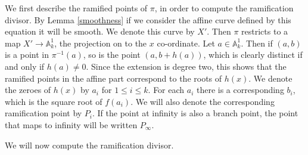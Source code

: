 We first describe the ramified points of $\pi$, in order to compute the ramification divisor.
By Lemma \ref{smoothness} if we consider the affine curve defined by this equation it will be smooth.
We denote this curve by $X'$.
Then $\pi$ restricts to a map $X'\rightarrow \mathbb A^1_k$, the projection on to the $x$ co-ordinate.
Let $a\in \mathbb A_k^1$.
Then if $(a,b)$ is a point in $\pi^{-1}(a)$, so is the point $(a,b+h(a))$, which is clearly distinct if and only if $h(a)\neq 0$.
Since the extension is degree two, this shows that the ramified points in the affine part correspond to the roots of $h(x)$.
We denote the zeroes of $h(x)$ by $a_i$ for $1\leq i \leq k$.
For each $a_i$ there is a corresponding $b_i$, which is the square root of $f(a_i)$.
We will also denote the corresponding ramification point by $P_i$.
If the point at infinity is also a branch point, the point that maps to infinity will be written $P_{\infty}$.

We will now compute the ramification divisor.


